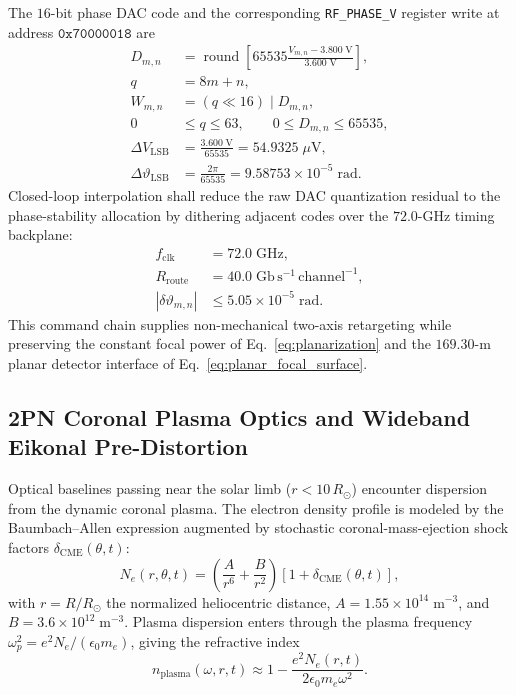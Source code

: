 \documentclass[10pt,twocolumn]{IEEEtran}
\begin{document}
The $16$-bit phase DAC code and the corresponding \texttt{RF\_PHASE\_V} register write at address $\mathtt{0x70000018}$ are
\begin{equation}
\begin{aligned}
D_{m,n}&=\operatorname{round}\!\left[
65535\frac{V_{m,n}-3.800\;\mathrm{V}}{3.600\;\mathrm{V}}
\right], \\
q&=8m+n, \\
W_{m,n}&=\left(q\ll16\right)\mathbin{\vert}D_{m,n}, \\
0&\leq q\leq63,\qquad 0\leq D_{m,n}\leq65535, \\
\Delta V_{\mathrm{LSB}}&=\frac{3.600\;\mathrm{V}}{65535}
=54.9325\;\mu\mathrm{V}, \\
\Delta\vartheta_{\mathrm{LSB}}&=\frac{2\pi}{65535}
=9.58753\times10^{-5}\;\mathrm{rad}.
\end{aligned}
\label{eq:dac_register_map}
\end{equation}
Closed-loop interpolation shall reduce the raw DAC quantization residual to the phase-stability allocation by dithering adjacent codes over the $72.0$-GHz timing backplane:
\begin{equation}
\begin{aligned}
f_{\mathrm{clk}}&=72.0\;\mathrm{GHz}, \\
R_{\mathrm{route}}&=40.0\;\mathrm{Gb\,s^{-1}\,channel^{-1}}, \\
\left|\delta\vartheta_{m,n}\right|&\leq5.05\times10^{-5}\;\mathrm{rad}.
\end{aligned}
\label{eq:phase_stability_allocation}
\end{equation}
This command chain supplies non-mechanical two-axis retargeting while preserving the constant focal power of Eq.~\eqref{eq:planarization} and the $169.30$-m planar detector interface of Eq.~\eqref{eq:planar_focal_surface}.

\subsection{2PN Coronal Plasma Optics and Wideband Eikonal Pre-Distortion}
\label{sec:coronal_2pn}

Optical baselines passing near the solar limb ($r<10\,R_\odot$)
encounter dispersion from the dynamic coronal plasma.  The electron
density profile is modeled by the Baumbach--Allen expression augmented
by stochastic coronal-mass-ejection shock factors
$\delta_{\mathrm{CME}}(\theta,t)$:
\begin{equation}
N_e(r,\theta,t)=\left(\frac{A}{r^{6}}+\frac{B}{r^{2}}\right)
\left[1+\delta_{\mathrm{CME}}(\theta,t)\right],
\label{eq:baumbach_allen}
\end{equation}
with $r=R/R_\odot$ the normalized heliocentric distance,
$A=1.55\times10^{14}\;\mathrm{m^{-3}}$, and
$B=3.6\times10^{12}\;\mathrm{m^{-3}}$.  Plasma dispersion enters through
the plasma frequency
$\omega_p^{2}=e^{2}N_e/(\epsilon_0 m_e)$, giving the refractive index
\begin{equation}
n_{\mathrm{plasma}}(\omega,r,t)\approx
1-\frac{e^{2}N_e(r,t)}{2\epsilon_0 m_e\omega^{2}}.
\label{eq:plasma_index}
\end{equation}
\end{document}
